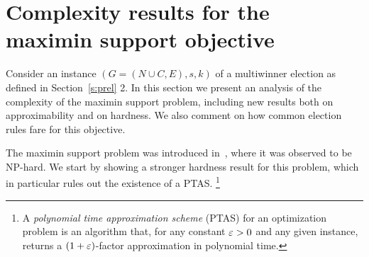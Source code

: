 \section{Complexity results for the maximin support objective}\label{s:complexity}

Consider an instance $(G=(N\cup C, E), s, k)$ of a multiwinner election as defined in Section~\ref{s:prel} 2. 
In this section we present an analysis of the complexity of the maximin support problem, including new results both on approximability and on hardness. 
We also comment on how common election rules fare for this objective.


The maximin support problem was introduced in~\cite{sanchez2016maximin}, where it was observed to be NP-hard. We start by showing a stronger hardness result for this problem, which in particular rules out the existence of a PTAS.%
\footnote{A \emph{polynomial time approximation scheme} (PTAS) for an optimization problem is an algorithm that, for any constant $\varepsilon>0$ and any given instance, returns a $(1+\varepsilon)$-factor approximation in polynomial time.} 


